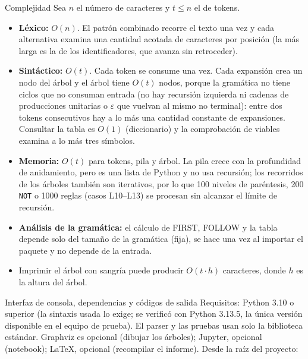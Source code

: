 \documentclass[11pt,letterpaper]{article}
\makeatletter
\renewcommand\subsection{\@startsection{subsection}{2}{\z@}{-2.6ex\@plus -1ex \@minus -.2ex}{1.0ex \@plus .2ex}%
  {\normalfont\large\bfseries}}
\newcommand{\T}[1]{\texttt{#1}}
\newcommand{\eps}{\ensuremath{\varepsilon}}
\makeatother
\begin{document}
\subsection{Complejidad}
Sea $n$ el número de caracteres y $t \le n$ el de tokens.
\begin{itemize}
\item \textbf{Léxico:} $O(n)$. El patrón combinado recorre el texto una vez y cada alternativa examina una cantidad
acotada de caracteres por posición (la más larga es la de los identificadores, que avanza sin retroceder).
\item \textbf{Sintáctico:} $O(t)$. Cada token se consume una vez. Cada expansión crea un nodo del árbol y el árbol
tiene $O(t)$ nodos, porque la gramática no tiene ciclos que no consuman entrada (no hay recursión izquierda ni
cadenas de producciones unitarias o \eps{} que vuelvan al mismo no terminal): entre dos tokens consecutivos hay a lo
más una cantidad constante de expansiones. Consultar la tabla es $O(1)$ (diccionario) y la comprobación de
viables examina a lo más tres símbolos.
\item \textbf{Memoria:} $O(t)$ para tokens, pila y árbol. La pila crece con la profundidad de anidamiento, pero es
una lista de Python y no usa recursión; los recorridos de los árboles también son iterativos, por lo que 100
niveles de paréntesis, 200 \T{NOT} o 1000 reglas (casos L10--L13) se procesan sin alcanzar el límite de recursión.
\item \textbf{Análisis de la gramática:} el cálculo de FIRST, FOLLOW y la tabla depende solo del tamaño de la
gramática (fija), se hace una vez al importar el paquete y no depende de la entrada.
\item Imprimir el árbol con sangría puede producir $O(t \cdot h)$ caracteres, donde $h$ es la altura del árbol.
\end{itemize}

\subsection{Interfaz de consola, dependencias y códigos de salida}
Requisitos: Python 3.10 o superior (la sintaxis usada lo exige; se verificó con Python 3.13.5, la única versión disponible en el equipo de prueba). El parser y las pruebas usan solo la biblioteca
estándar. Graphviz es opcional (dibujar los árboles); Jupyter, opcional (notebook); LaTeX, opcional (recompilar el
informe). Desde la raíz del proyecto:
\end{document}
